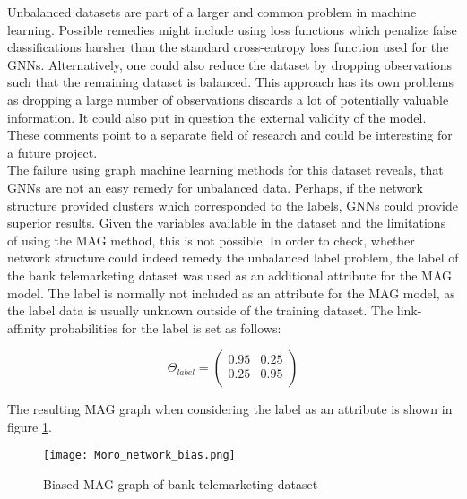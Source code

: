   \noindent Unbalanced datasets are part of a larger and common problem in 
  machine learning. Possible remedies might include using loss functions which 
  penalize false classifications harsher than the standard cross-entropy loss 
  function used for the GNNs. Alternatively, one could also reduce the dataset 
  by dropping observations such that the remaining dataset is balanced. This 
  approach has its own problems as dropping a large number of observations 
  discards a lot of potentially valuable information. It could also put in 
  question the external validity of the model. These comments point to a 
  separate field of research and could be interesting for a future project. \\

  \noindent The failure using graph machine learning methods for this dataset
  reveals, that GNNs are not an easy remedy for unbalanced data. Perhaps, if the
  network structure provided clusters which corresponded to the labels, GNNs
  could provide superior results. Given the variables available in the dataset
  and the limitations of using the MAG method, this is not possible. In order
  to check, whether network structure could indeed remedy the unbalanced label
  problem, the label of the bank telemarketing dataset was used as an
  additional attribute for the MAG model. The label is normally not included as 
  an attribute for the MAG model, as the label data is usually unknown outside 
  of the training dataset. The link-affinity probabilities for the label is set
  as follows:

  \[ \Theta_{label} = 
	\begin{pmatrix}
        0.95 & 0.25 \\
		0.25 & 0.95 \\
	\end{pmatrix}
	\] 
  
  \noindent The resulting MAG graph when considering the label as an attribute 
  is shown in figure \ref{fig:Moro_bias}.

  \begin{figure}[h]
		\centering
		\texttt{[image: Moro\_network\_bias.png]}
		\caption{Biased MAG graph of bank telemarketing dataset}
        \label{fig:Moro_bias}
  \end{figure}

